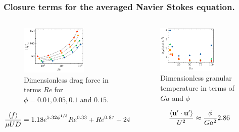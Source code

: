 \documentclass{sintefbeamer}
\begin{document}
\begin{frame}
  \frametitle{Closure terms for the averaged Navier Stokes equation.}
\begin{columns}
  \begin{column}{0.5\textwidth}
    \begin{figure}
      \includegraphics[width=0.7\textwidth]{image/HOMOGENEOUS/fCA/FH_mu_Re.pdf}
      \caption{Dimensionless drag force in terms $Re$ for $\phi = 0.01, 0.05, 0.1$ and $0.15$.}
    \end{figure}
    \begin{equation*}
      \frac{\left<f\right>}{\mu UD} 
      = 1.18 e^{5.32\phi^{1/3}}  Re^{0.33}  + Re^{0.87} +24.12
    \end{equation*}
  \end{column}
  \begin{column}{0.5\textwidth}
    \begin{figure}[h!]
      \centering
      \includegraphics[width=0.7\textwidth]{image/HOMOGENEOUS/fPA/Talpha.pdf}
      \caption{Dimensionless granular temperature in terms of $Ga$ and $\phi$}
  \end{figure}
  	\begin{equation}
    \frac{\left<\textbf{u}'\cdot \textbf{u}'\right>}{U^2}  
    \approx \frac{\phi}{Ga^2} 2.86 
    \label{eq:Talpha_scaling}
	\end{equation}
  \end{column}
\end{columns}


\end{frame}
\end{document}
